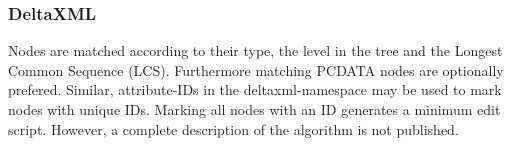 


\subsubsection{DeltaXML\cite{DELTAXML}}
Nodes are matched according to their type, the level in the tree and the Longest Common Sequence (LCS). Furthermore matching PCDATA nodes are optionally prefered. Similar, attribute-IDs in the deltaxml-namespace may be used to mark nodes with unique IDs. Marking all nodes with an ID generates a minimum edit script. However, a complete description of the algorithm is not published.

